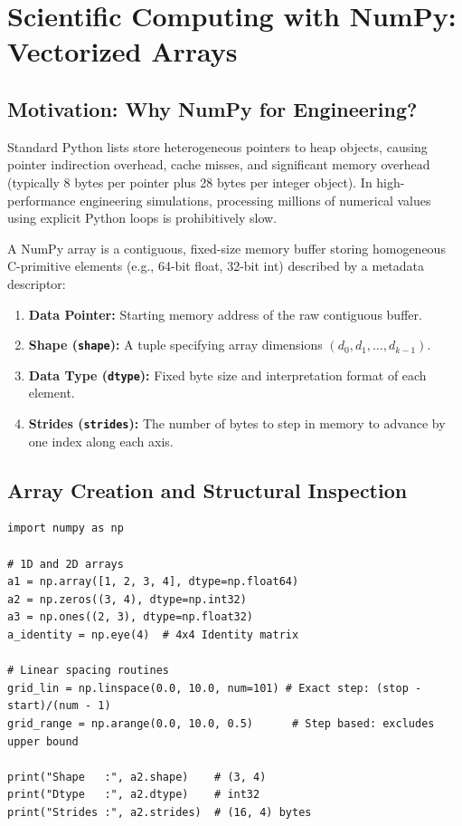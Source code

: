 \chapter{Scientific Computing with NumPy: Vectorized Arrays}
\label{ch:numpy_arrays}

\section{Motivation: Why NumPy for Engineering?}

Standard Python lists store heterogeneous pointers to heap objects, causing pointer indirection overhead, cache misses, and significant memory overhead (typically 8 bytes per pointer plus 28 bytes per integer object). In high-performance engineering simulations, processing millions of numerical values using explicit Python loops is prohibitively slow.

\begin{definition}
A NumPy array is a contiguous, fixed-size memory buffer storing homogeneous C-primitive elements (e.g., 64-bit float, 32-bit int) described by a metadata descriptor:
\begin{enumerate}[leftmargin=1.8em, itemsep=2pt]
    \item \textbf{Data Pointer:} Starting memory address of the raw contiguous buffer.
    \item \textbf{Shape (\texttt{shape}):} A tuple specifying array dimensions $(d_0, d_1, \dots, d_{k-1})$.
    \item \textbf{Data Type (\texttt{dtype}):} Fixed byte size and interpretation format of each element.
    \item \textbf{Strides (\texttt{strides}):} The number of bytes to step in memory to advance by one index along each axis.
\end{enumerate}
\end{definition}

\section{Array Creation and Structural Inspection}

\begin{lstlisting}[caption={Fundamental NumPy Creation Routines}]
import numpy as np

# 1D and 2D arrays
a1 = np.array([1, 2, 3, 4], dtype=np.float64)
a2 = np.zeros((3, 4), dtype=np.int32)
a3 = np.ones((2, 3), dtype=np.float32)
a_identity = np.eye(4)  # 4x4 Identity matrix

# Linear spacing routines
grid_lin = np.linspace(0.0, 10.0, num=101) # Exact step: (stop - start)/(num - 1)
grid_range = np.arange(0.0, 10.0, 0.5)      # Step based: excludes upper bound

print("Shape   :", a2.shape)    # (3, 4)
print("Dtype   :", a2.dtype)    # int32
print("Strides :", a2.strides)  # (16, 4) bytes
\end{lstlisting}

